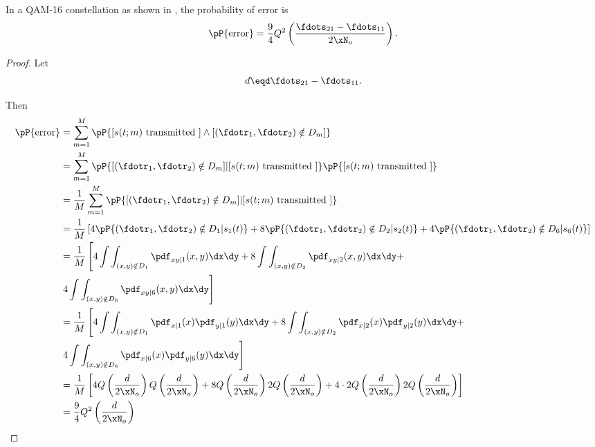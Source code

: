 \begin{theorem}
In a QAM-16 constellation as shown in ,
the probability of error is
\[ \pP{\mbox{error}} = \frac{9}{4} Q^2\left(\frac{\fdots_{21}-\fdots_{11}}{2\xN_o}\right).\]
\end{theorem}

\begin{proof}
Let
\[ d \eqd \fdots_{21}-\fdots_{11}.\]

Then
\begin{align*}
   \pP{\mbox{error}}
     &= \sum_{m=1}^M \pP{[s(t;m)\mbox{ transmitted }]\land
                            [(\fdotr_1,\fdotr_2)\notin D_m] }
   \\&= \sum_{m=1}^M \pP{[(\fdotr_1,\fdotr_2)\notin D_m]|
                            [s(t;m)\mbox{ transmitted }] }
                      \pP{[s(t;m)\mbox{ transmitted }]}
   \\&= \frac{1}{M}
         \sum_{m=1}^M \pP{[(\fdotr_1,\fdotr_2)\notin D_m]|
                            [s(t;m)\mbox{ transmitted }] }
   \\&= \frac{1}{M}\left[
         4 \pP{(\fdotr_1,\fdotr_2)\notin D_1 | s_1(t)} +
         8 \pP{(\fdotr_1,\fdotr_2)\notin D_2 | s_2(t)} +
         4 \pP{(\fdotr_1,\fdotr_2)\notin D_6 | s_6(t)}
         \right]
   \\&= \frac{1}{M}\left[
         4 \int\int_{(x,y)\notin D_1} \pdf_{xy|1}(x,y)\dx\dy +
         8 \int\int_{(x,y)\notin D_2} \pdf_{xy|2}(x,y)\dx\dy + \right.
         \\& \left.4 \int\int_{(x,y)\notin D_6} \pdf_{xy|6}(x,y)\dx\dy
         \right]
   \\&= \frac{1}{M}\left[
         4 \int\int_{(x,y)\notin D_1} \pdf_{x|1}(x) \pdf_{y|1}(y)\dx\dy +
         8 \int\int_{(x,y)\notin D_2} \pdf_{x|2}(x) \pdf_{y|2}(y)\dx\dy + \right.
         \\& \left.4 \int\int_{(x,y)\notin D_6} \pdf_{x|6}(x) \pdf_{y|6}(y)\dx\dy
         \right]
   \\&= \frac{1}{M} \left[
         4 Q\left(\frac{d}{2\xN_o}\right) Q\left(\frac{d}{2\xN_o}\right) +
         8 Q\left(\frac{d}{2\xN_o}\right) 2Q\left(\frac{d}{2\xN_o}\right) +
         4\cdot2 Q\left(\frac{d}{2\xN_o}\right) 2Q\left(\frac{d}{2\xN_o}\right)
         \right]
   \\&= \frac{9}{4} Q^2\left(\frac{d}{2\xN_o}\right)
\end{align*}
\end{proof}

